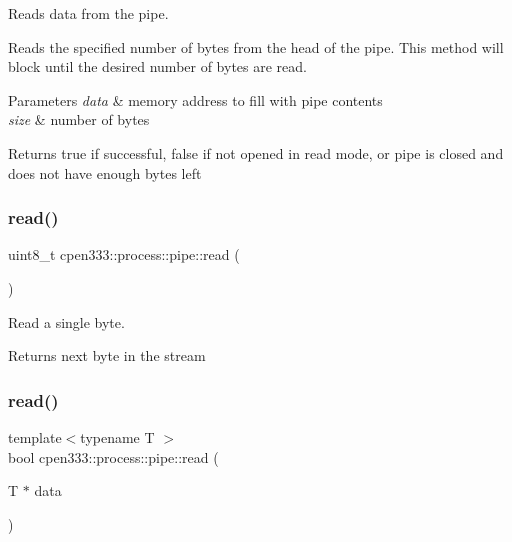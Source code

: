 Reads data from the pipe. 

Reads the specified number of bytes from the head of the pipe. This method will block until the desired number of bytes are read.


\begin{DoxyParams}{Parameters}
{\em data} & memory address to fill with pipe contents \\
\hline
{\em size} & number of bytes \\
\hline
\end{DoxyParams}
\begin{DoxyReturn}{Returns}
true if successful, false if not opened in read mode, or pipe is closed and does not have enough bytes left 
\end{DoxyReturn}
\mbox{\label{classcpen333_1_1process_1_1pipe_a165e12b1cb0fc16f1732e29b8022d7df}} 
\subsubsection{\texorpdfstring{read()}{read()}\hspace{0.1cm}{\footnotesize\ttfamily [2/3]}}
{\footnotesize\ttfamily uint8\+\_\+t cpen333\+::process\+::pipe\+::read (\begin{DoxyParamCaption}{ }\end{DoxyParamCaption})\hspace{0.3cm}{\ttfamily [inline]}}



Read a single byte. 

\begin{DoxyReturn}{Returns}
next byte in the stream 
\end{DoxyReturn}
\mbox{\label{classcpen333_1_1process_1_1pipe_a67c555d0003807fcbc8a3ae1b6ee0f97}} 
\subsubsection{\texorpdfstring{read()}{read()}\hspace{0.1cm}{\footnotesize\ttfamily [3/3]}}
{\footnotesize\ttfamily template$<$typename T $>$ \\
bool cpen333\+::process\+::pipe\+::read (\begin{DoxyParamCaption}\item[{T $\ast$}]{data }\end{DoxyParamCaption})\hspace{0.3cm}{\ttfamily [inline]}}



